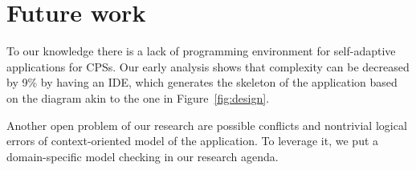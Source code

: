 \section{Future work}

To our knowledge there is a lack of programming environment for self-adaptive
applications for CPSs. Our early analysis shows that complexity can be
decreased by 9\% by having an IDE, which generates the skeleton of the
application based on the diagram akin to the one in Figure~\ref{fig:design}.

Another open problem of our research are possible conflicts and nontrivial
logical errors of context-oriented model of the application. To leverage it, we
put a domain-specific model checking in our research agenda.
